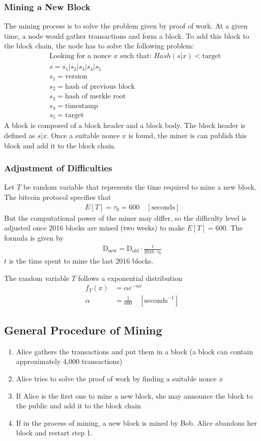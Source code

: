 \documentclass[12pt,a4paper]{article}
\begin{document}
\subsubsection{Mining a New Block}
The mining process is to solve the problem given by proof of work. At a given time, a node would gather transactions and form a block. To add this block to the block chain, the node has to solve the following problem:
\begin{align*}
&\text{Looking for a nonce $x$ such that: } Hash(s|x) < \text{target}\\
&s = s_1 | s_2 | s_3 | s_4 | s_5\\
&s_1 = \text{version}\\
&s_2 = \text{hash of previous block}\\
&s_3 = \text{hash of merkle root}\\
&s_4 = \text{timestamp }\\
&s_5 = \text{target}
\end{align*}
A block is composed of a block header and a block body. The block header is defined as $s|x$. Once a suitable nonce $x$ is found, the miner is can publish this block and add it to the block chain.
\subsubsection{Adjustment of Difficulties}
Let $T$ be random variable that represents the time required to mine a new block. The bitcoin protocol specifies that 
\begin{align*}
E[T] = \tau_0 = 600 \quad [\text{seconds}]
\end{align*}
But the computational power of the miner may differ, so the difficulty level is adjusted once 2016 blocks are mined (two weeks) to make $E[T] = 600 $. The formula is given by 
\begin{align*}
\text{D}_{\text{new}} = \text{D}_{\text{old}} \cdot \frac{t}{2016\cdot \tau_0}
\end{align*}
$t$ is the time spent to mine the last 2016 blocks. 


The random variable $T$ follows a exponential distribution 
\begin{align*}
f_T(x) &= \alpha e^{-\alpha x} \\
\alpha & = \frac{1}{600} \quad [\text{seconds}^{-1}]
\end{align*}
\subsection{General Procedure of Mining}
\begin{enumerate}
	\item Alice gathers the transactions and put them in a block (a block can contain approximately 4,000 transactions)
	\item Alice tries to solve the proof of work by finding a suitable nonce $x$
	\item If Alice is the first one to mine a new block, she may announce the block to the public and add it to the block chain
	\item If in the process of mining, a new block is mined by Bob. Alice abandons her block and restart step 1.
\end{enumerate}
\end{document}
